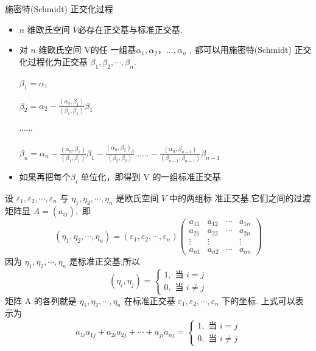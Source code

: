 \documentclass[13pt]{beamer}
\begin{document}
\begin{frame}{施密特(Schmidt) 正交化过程}
 \begin{itemize}
	\item $n$ 维欧氏空间 $V$必存在正交基与标准正交基.
 
	\item 对 $n$ 维欧氏空间 V的任
一组基$\alpha_1, \alpha_2，..., \alpha_n$ , 都可以用\alert{施密特(Schmidt) 正交化过程}化为正交基
$\beta_1, \beta_{2}, \cdots, \beta_{n}$.

 
$\beta_{1}=\alpha_{1}$

$\beta_{2}=\alpha_{2}-\frac{\left(\alpha_{2}, \beta_{1}\right)}{\left(\beta_{1}, \beta_{1}\right)} \beta_{1}$

$\cdots \cdots$

$\beta_{n}=\alpha_{n}-\frac{\left(\alpha_{n}, \beta_{1}\right)}{\left(\beta_{1}, \beta_{1}\right)} \beta_{1}-\frac{\left(\alpha_{n}, \beta_{2}\right)_{\beta}}{\left(\beta_{2}, \beta_{2}\right)} \ldots \ldots-\frac{\left(\alpha_{n}, \beta_{n-1}\right)}{\left(\beta_{n-1}, \beta_{n-1}\right)} \beta_{n-1}$

	\item 如果再把每个$\beta_i$ 单位化，即得到 V 的一组标准正交基
\end{itemize}

\end{frame}


\begin{frame}
设 ${\varepsilon}_{1}, {\varepsilon}_{2}, \cdots, {\varepsilon}_{n}$ 与 ${\eta}_{1}, {\eta}_{2}, \cdots, {\eta}_{n}$ 是欧氏空间 $V$ 中的两组标
准正交基,它们之间的过渡矩阵显 ${A}=\left(a_{i j}\right),$ 即
\[
\left(\eta_{1}, \eta_{2}, \cdots, \eta_{n}\right)=\left(\varepsilon_{1}, \varepsilon_{2}, \cdots, \varepsilon_{n}\right)\left(\begin{array}{cccc}
a_{11} & a_{12} & \cdots & a_{1 n} \\
a_{21} & a_{22} & \cdots & a_{2 n} \\
\vdots & \vdots & & \vdots \\
a_{n 1} & a_{n 2} & \cdots & a_{n n}
\end{array}\right)
\]
因为 ${\eta}_{1}, {\eta}_{2}, \cdots, {\eta}_{n}$ 是标准正交基,所以
\[
\left({\eta}_{i}, {\eta}_{j}\right)=\left\{\begin{array}{l}
1, \text { 当 } i=j \\
0, \text { 当 } i \neq j
\end{array}\right.
\]
矩阵 A 的各\alert{列}就是 ${\eta}_{1}, {\eta}_{2}, \cdots, {\eta}_{n}$ 在标准正交基 ${\varepsilon}_{1}, {\varepsilon}_{2}, \cdots, {\varepsilon}_{n}$ 下的坐标.
上式可以表示为
\[
a_{1 i} a_{1 j}+a_{2 i} a_{2 j}+\cdots+a_{j i} a_{n j}=\left\{\begin{array}{l}
1, \text { 当 } i=j \\
0, \text { 当 } i \neq j
\end{array}\right.
\]

\end{frame}
\end{document}
